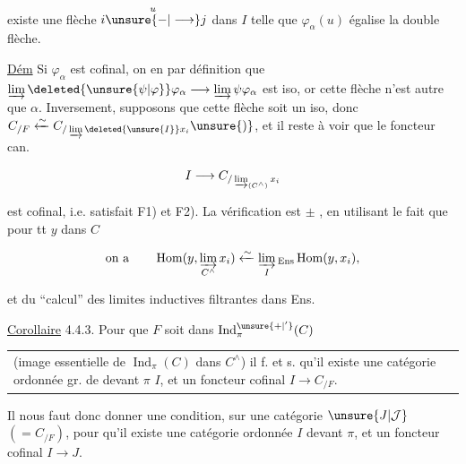 

existe une flèche $i\overset{u}{\unsure{-|\longrightarrow}}j$ dans $I$ telle que $\varphi_\alpha(u)$ égalise la double flèche.

\uline{Dém} Si $\varphi_\alpha$ est cofinal, on en  par définition que $\varinjlim\deleted{\unsure{\psi|\varphi}}\varphi_\alpha\longrightarrow\varinjlim\psi\varphi_\alpha$ est iso, or cette flèche n'est autre que $\alpha$. Inversement, supposons que cette flèche soit un iso, donc $C_{/F}\xleftarrow{\sim}C_{/\varinjlim\deleted{\unsure{I}} x_i}\unsure{)}$, et il reste à voir que le foncteur can.

\[
I\longrightarrow C_{/\varinjlim_{(C^\wedge)}x_i}
\]

est cofinal, i.e. satisfait F1) et F2). La vérification est $\pm$ , en utilisant le fait que pour tt \deleted{\unsure{$\zeta$}}$y$ \deleted{\unsure{$\in$}} \inserted{$\leftarrow$} dans $C$ 

\[
\text{on a}\qquad \operatorname{Hom}(y,\varinjlim_{C^\wedge}x_i)\xleftarrow{\sim}\varinjlim_I{}_{\mathrm{Ens}}\operatorname{Hom}(y,x_i),
\]

et du ``calcul'' des limites inductives filtrantes dans Ens. \unsure{$\mathsection$|$\square$}

\uline{Corollaire} 4.4.3.  Pour que $F$ soit dans $\operatorname{Ind}^{\unsure{+|'}}_{\pi}(C)$\newline
\begin{tabular}{@{}|p{.91\linewidth}@{}}
(image essentielle de $\operatorname{Ind}_{\pi}(C)$ dans $C^\wedge$) il f. et s. qu'il existe une catégorie ordonnée gr. de devant $\pi$ $I$, et un foncteur cofinal $I\longrightarrow C_{/F}$.
\end{tabular}

Il  nous faut donc donner une condition, sur une catégorie $\unsure{J|\mathcal J}$ $(=C_{/F})$, pour qu'il existe une catégorie ordonnée $I$  devant $\pi$, et un foncteur cofinal $I\longrightarrow J$.

